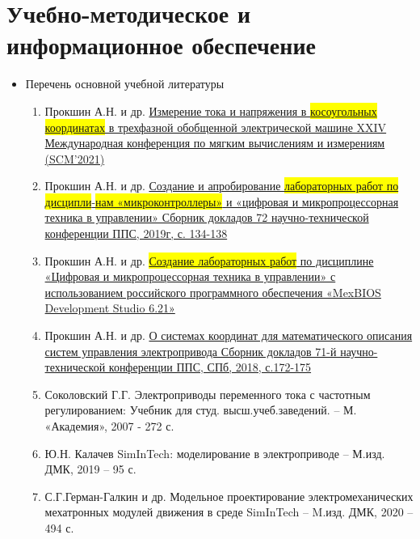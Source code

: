 \newpage
\section{Учебно-методическое и информационное обеспечение}
\begin{itemize}
\item Перечень основной учебной литературы
\begin{enumerate}
           \item \small{\footnotesize{
               Прокшин А.Н. и др.
              \href{https://scm.etu.ru/assets/files/2021/scm21/papers/113-115.pdf}
              {Измерение тока и напряжения в \colorbox{yellow}{косоугольных координатах} в трехфазной обобщенной электрической машине
               XXIV Международная конференция по мягким вычислениям и измерениям (SCM'2021)}}}
           \item \small{\footnotesize{
               Прокшин А.Н. и др.
               \href{https://etu.ru/assets/files/university/irvc/konferencii/2019/pps/sbornik-72-pps-2019.pdf}
                { Создание и апробирование \colorbox{yellow}{лабораторных работ по дисципли}-\colorbox{yellow}{нам «микроконтроллеры»} и «цифровая и микропроцессорная техника в управлении»
                  Сборник докладов 72 научно-технической конференции ППС, 2019г, с. 134-138}}}
           \item \small{\footnotesize{
               Прокшин А.Н. и др.
               \href{https://conf-ntores.etu.ru/assets/files/2021/cp/papers/331-332.pdf}
               {\colorbox{yellow}{Создание лабораторных работ} по дисциплине «Цифровая и микропроцессорная техника в управлении» с использованием российского программного обеспечения «MexBIOS Development Studio 6.21»}}}
           \item \small{\footnotesize{
               Прокшин А.Н. и др.
               \href{https://etu.ru/assets/files/university/irvc/konferencii/2018/pps-2018.pdf}
               {О системах координат для математического описания систем управления электропривода Сборник докладов 71-й научно-технической конференции ППС, СПб, 2018, с.172-175}}}
        \item \small{\footnotesize{ Соколовский Г.Г. Электроприводы переменного тока с частотным регулированием: Учебник для студ. высш.учеб.заведений.
                -- М. «Академия», 2007 - 272 с.}}
         \item \small{\footnotesize{Ю.Н. Калачев SimInTech: моделирование в электроприводе -- М.изд. ДМК, 2019 -- 95 с.}}
         \item \small{\footnotesize{С.Г.Герман-Галкин и др. Модельное проектирование электромеханических мехатронных модулей движения в среде SimInTech -- M.изд. ДМК, 2020 -- 494 с.}}


\end{enumerate}
\end{itemize}
